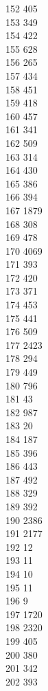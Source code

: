 { 152	405 \\
 153	349 \\
 154	422 \\
 155	628 \\
 156	265 \\
 157	434 \\
 158	451 \\
 159	418 \\
 160	457 \\
 161	341 \\
 162	509 \\
 163	314 \\
 164	430 \\
 165	386 \\
 166	394 \\
 167	1879 \\
 168	308 \\
 169	478 \\
 170	4069 \\
 171	393 \\
 172	420 \\
 173	371 \\
 174	453 \\
 175	441 \\
 176	509 \\
 177	2423 \\
 178	294 \\
 179	449 \\
 180	796 \\
 181	43 \\
 182	987 \\
 183	20 \\
 184	187 \\
 185	396 \\
 186	443 \\
 187	492 \\
 188	329 \\
 189	392 \\
 190	2386 \\
 191	2177 \\
 192	12 \\
 193	11 \\
 194	10 \\
 195	11 \\
 196	9 \\
 197	1720 \\
 198	2320 \\
 199	405 \\
 200	380 \\
 201	342 \\
 202	393 \\
}

